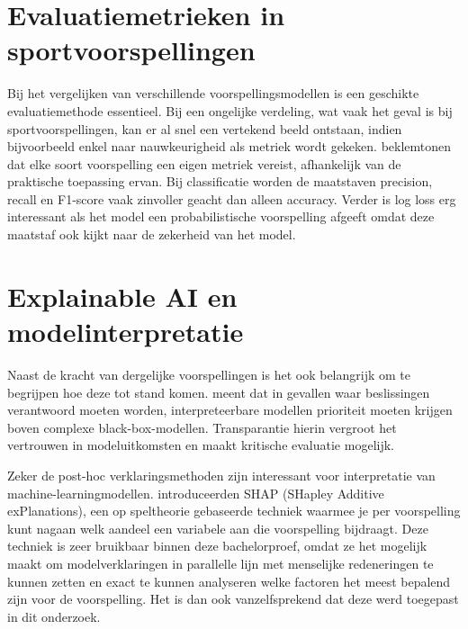 \vspace{5pt}

\section{Evaluatiemetrieken in sportvoorspellingen}

Bij het vergelijken van verschillende voorspellingsmodellen is een geschikte evaluatiemethode essentieel.
Bij een ongelijke verdeling, wat vaak het geval is bij sportvoorspellingen, kan er al snel een vertekend beeld ontstaan, indien bijvoorbeeld
enkel naar nauwkeurigheid als metriek wordt gekeken.
\textcite{Berrar2019} beklemtonen dat elke soort voorspelling een eigen metriek vereist, afhankelijk van de praktische toepassing ervan.
Bij classificatie worden de maatstaven precision, recall en F1-score vaak zinvoller geacht dan alleen accuracy.
Verder is log loss erg interessant als het model een probabilistische voorspelling afgeeft
omdat deze maatstaf ook kijkt naar de zekerheid van het model.

\vspace{5pt}

\section{Explainable AI en modelinterpretatie}

Naast de kracht van dergelijke voorspellingen is het ook belangrijk om te begrijpen hoe deze tot stand komen.
\textcite{Rudin2019} meent dat in gevallen waar beslissingen verantwoord moeten worden,
interpreteerbare modellen prioriteit moeten krijgen boven complexe black-box-modellen.
Transparantie hierin vergroot het vertrouwen in modeluitkomsten en maakt kritische evaluatie mogelijk.

\vspace{5pt}

Zeker de post-hoc verklaringsmethoden zijn interessant voor interpretatie van machine-learningmodellen.
\textcite{Lundberg2017} introduceerden SHAP (SHapley Additive exPlanations), 
een op speltheorie gebaseerde techniek waarmee je per voorspelling kunt nagaan welk aandeel een variabele aan die voorspelling bijdraagt. 
Deze techniek is zeer bruikbaar binnen deze bachelorproef, omdat ze het mogelijk maakt om modelverklaringen in parallelle lijn met menselijke redeneringen te kunnen zetten 
en exact te kunnen analyseren welke factoren het meest bepalend zijn voor de voorspelling. Het is dan ook vanzelfsprekend dat deze werd toegepast in dit onderzoek.

